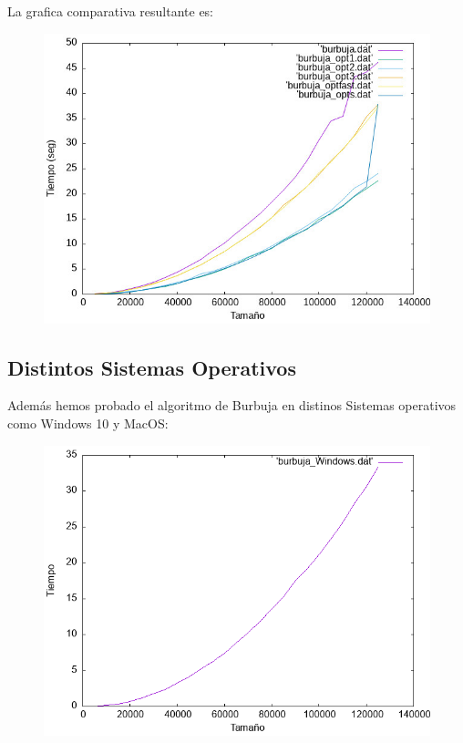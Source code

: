 \documentclass[12pt, spanish]{article}
\begin{document}
La grafica comparativa resultante es:
\begin{figure}[H]
  \centering
  \includegraphics[scale = 0.7]{allBurbujas.png}
\end{figure}

\subsection{Distintos Sistemas Operativos}
Además hemos probado el algoritmo de Burbuja en distinos Sistemas operativos como Windows 10 y MacOS:

\begin{figure}[H]
  \centering
  \includegraphics[scale = 0.7]{burbujaWindows.png}
\end{figure}
\end{document}
